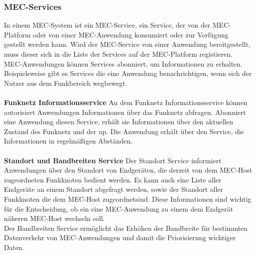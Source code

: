\documentclass[runningheads]{llncs}
\numberwithin{figure}{section}
\begin{document}
\subsubsection{MEC-Services}
In einem MEC-System ist ein MEC-Service, ein Service, der von der MEC-Platform oder von einer MEC-Anwendung konsumiert oder zur Verfügung gestellt werden kann. 
Wird der MEC-Service von einer Anwendung bereitgestellt, muss dieser sich in die Liste der Services auf der MEC-Platform registieren. MEC-Anwendungen können 
Services abonniert, um Informationen zu erhalten. Beispielsweise gibt es Services die eine Anwendung benachrichtigen, wenn sich der Nutzer aus dem Funkbereich wegbewegt.
\\
\\
\textbf{Funknetz Informationsservice}
An dem Funknetz Informationsservice können autorisiert Anwendungen Informationen über das Funknetz abfragen.
Abonniert eine Anwendung diesen Service, erhält sie Informationen über den aktuellen Zustand des Funknetz und der \acrshort{up}. Die Anwendung erhält über den Service,
die Informationen in regelmäßigen Abständen.
\\
\\
\textbf{Standort und Bandbreiten Service}
Der Standort Service informiert Anwendungen über den Standort von Endgeräten, 
die derzeit von dem MEC-Host zugeordneten Funkknoten bedient werden. 
Es kann auch eine Liste aller Endgeräte an einem Standort abgefragt werden, sowie der Standort aller
Funkknoten die dem MEC-Host zugeordnetsind. 
Diese Informationen sind wichtig für die Entscheidung, ob ein eine MEC-Anwendung zu einem dem Endgerät näheren MEC-Host wechseln soll.
\\
Der Bandbreiten Service ermöglicht das Erhöhen der Bandbreite für bestimmten Datenverkehr von MEC-Anwendungen und damit die Priorisierung wichtiger Daten.
\end{document}
